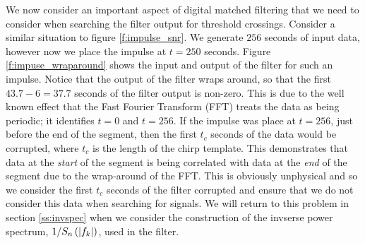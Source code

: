 We now consider an important aspect of digital matched filtering that we need
to consider when searching the filter output for threshold crossings. Consider
a similar situation to figure \ref{f:impulse_snr}. We generate $256$ seconds of
input data, however now we place the impulse at $t = 250$ seconds. Figure
\ref{f:impuse_wraparound} shows the input and output of the filter for such an
impulse. Notice that the output of the filter wraps around, so that the first 
$43.7-6 = 37.7$ seconds of the filter output is non-zero. This is due to the
well known effect that the Fast Fourier Transform (FFT) treats the data as being
periodic; it identifies $t=0$ and $t=256$\cite{fftbook}. If the impulse was
place at $t=256$, just before the end of the segment, then the first $t_c$
seconds of the data would be corrupted, where $t_c$ is the length of the chirp
template. This demonstrates that data at the \emph{start} of the segment is
being correlated with data at the \emph{end} of the segment due to the
wrap-around of the FFT. This is obviously unphysical and so we consider the
first $t_c$ seconds of the filter corrupted and ensure that we do not consider
this data when searching for signals. We will return to this problem in section
\ref{ss:invspec} when we consider the construction of the invserse power
spectrum, $1/S_n\left(\left|f_{k}\right|\right)$, used in the filter.
